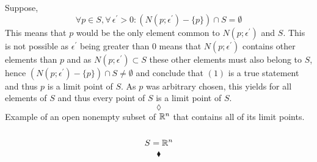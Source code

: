 Suppose, 
$$\forall p\in S, \forall\, \epsilon^{'}>0: \left(N(p;\epsilon^{'})-\{p\}\right)\cap S= \emptyset $$
This means that $p$ would be the only element common to $N(p;\epsilon^{'})$ and $S$. This is not possible as $\epsilon^{'}$ being greater than $0$ means that $N(p;\epsilon^{'})$ contains other elements than $p$ and as $N(p;\epsilon^{'})\subset S$ these other elements must also belong to $S$, hence $\left(N(p;\epsilon^{'})-\{p\}\right)\cap S \neq \emptyset $ and conclude that $(1)$ is a true statement and thus $p$ is a limit point of $S$. As $p$ was arbitrary chosen, this yields for all elements of $S$ and thus every point of $S$ is a limit point of $S$.  
$$\lozenge$$
Example of an open nonempty subset of $\mathbb{R}^n$ that contains all of its limit points.\\\\
$$S=\mathbb{R}^n$$
$$\blacklozenge$$\\


